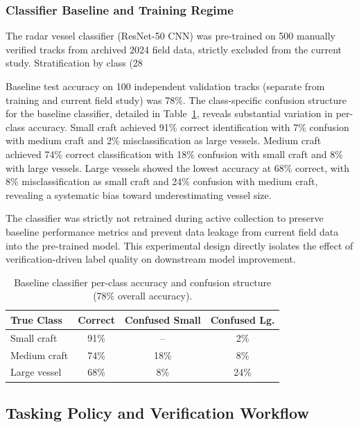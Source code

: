 \documentclass[conf]{asmeconf}
\begin{document}
\subsubsection{Classifier Baseline and Training Regime}

The radar vessel classifier (ResNet-50 CNN) was pre-trained on 500 manually verified tracks from archived 2024 field data, strictly excluded from the current study. Stratification by class (28%

Baseline test accuracy on 100 independent validation tracks (separate from training and current field study) was 78\%. The class-specific confusion structure for the baseline classifier, detailed in Table~\ref{tab:baseline_confusion}, reveals substantial variation in per-class accuracy. Small craft achieved 91\% correct identification with 7\% confusion with medium craft and 2\% misclassification as large vessels. Medium craft achieved 74\% correct classification with 18\% confusion with small craft and 8\% with large vessels. Large vessels showed the lowest accuracy at 68\% correct, with 8\% misclassification as small craft and 24\% confusion with medium craft, revealing a systematic bias toward underestimating vessel size.

The classifier was strictly not retrained during active collection to preserve baseline performance metrics and prevent data leakage from current field data into the pre-trained model. This experimental design directly isolates the effect of verification-driven label quality on downstream model improvement.

\begin{table}[t]
\caption{Baseline classifier per-class accuracy and confusion structure (78\% overall accuracy).}
\label{tab:baseline_confusion}
\centering
\small
\begin{tabular}{@{}lccc@{}}
\toprule
True Class & Correct & Confused Small & Confused Lg. \\
\midrule
Small craft & 91\% & -- & 2\% \\
Medium craft & 74\% & 18\% & 8\% \\
Large vessel & 68\% & 8\% & 24\% \\
\bottomrule
\end{tabular}
\end{table}

\subsection{Tasking Policy and Verification Workflow}
\end{document}
